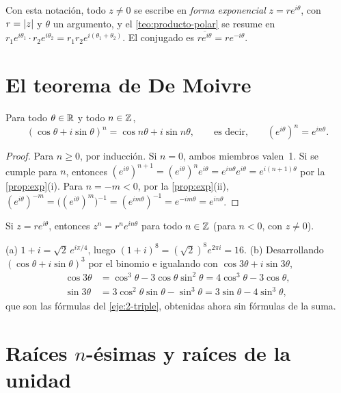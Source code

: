 Con esta notación, todo $z\ne0$ se escribe en \emph{forma exponencial} $z=re^{i\theta}$, con $r=\lvert z\rvert$ y $\theta$ un argumento, y el \cref{teo:producto-polar} se resume en $r_1e^{i\theta_1}\cdot r_2e^{i\theta_2}=r_1r_2e^{i(\theta_1+\theta_2)}$. El conjugado es $\overline{re^{i\theta}}=re^{-i\theta}$.

\section{El teorema de De Moivre}

\begin{teorema}[De Moivre]\label{teo:demoivre}
Para todo $\theta\in\mathbb{R}$ y todo $n\in\mathbb{Z}$,
\[
(\cos\theta+i\sin\theta)^{n}=\cos n\theta+i\sin n\theta,\qquad\text{es decir,}\qquad (e^{i\theta})^{n}=e^{in\theta}.
\]
\end{teorema}

\begin{proof}
Para $n\ge0$, por inducción. Si $n=0$, ambos miembros valen~1. Si se cumple para $n$, entonces $(e^{i\theta})^{n+1}=(e^{i\theta})^{n}e^{i\theta}=e^{in\theta}e^{i\theta}=e^{i(n+1)\theta}$ por la \cref{prop:exp}(i). Para $n=-m<0$, por la \cref{prop:exp}(ii), $(e^{i\theta})^{-m}=\bigl((e^{i\theta})^{m}\bigr)^{-1}=(e^{im\theta})^{-1}=e^{-im\theta}=e^{in\theta}$.
\end{proof}

\begin{corolario}
Si $z=re^{i\theta}$, entonces $z^{n}=r^{n}e^{in\theta}$ para todo $n\in\mathbb{Z}$ (para $n<0$, con $z\ne0$).
\end{corolario}

\begin{ejemplo}\label{ej:demoivre}
(a) $1+i=\sqrt2\,e^{i\pi/4}$, luego $(1+i)^{8}=(\sqrt2)^{8}e^{2\pi i}=16$. (b) Desarrollando $(\cos\theta+i\sin\theta)^{3}$ por el binomio e igualando con $\cos3\theta+i\sin3\theta$,
\begin{align*}
\cos3\theta&=\cos^{3}\theta-3\cos\theta\sin^{2}\theta=4\cos^{3}\theta-3\cos\theta,\\
\sin3\theta&=3\cos^{2}\theta\sin\theta-\sin^{3}\theta=3\sin\theta-4\sin^{3}\theta,
\end{align*}
que son las fórmulas del \cref{eje:2-triple}, obtenidas ahora sin fórmulas de la suma.
\end{ejemplo}

\section{Raíces \texorpdfstring{$n$}{n}-ésimas y raíces de la unidad}

